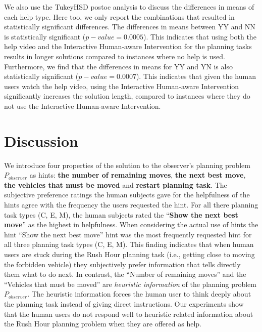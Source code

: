 We also use the TukeyHSD postoc analysis to discuss the differences in means of each help type.
Here too, we only report the combinations that resulted in statistically significant differences.
The differences in means between YY and NN is statistically significant ($p-value=0.0005$).
This indicates that using both the help video and the Interactive Human-aware Intervention  for the planning tasks results in longer solutions compared to instances where no help is used.
Furthermore, we find that the differences in means for YY and YN is also statistically significant ($p-value=0.0007$).
This indicates that given the human users watch the help video, using the Interactive Human-aware Intervention significantly increases the solution length, compared to instances where they do not use the Interactive Human-aware Intervention.


\section{Discussion}
We introduce four properties of the solution to the observer's planning problem $P_{observer}$ as hints: \textbf{the number of remaining moves}, \textbf{the next best move}, \textbf{the vehicles that must be moved} and \textbf{restart planning task}.
The subjective preference ratings the human subjects gave for the helpfulness of the hints agree with the frequency the users requested the hint.
For all there planning task types (C, E, M), the human subjects rated the ``\textbf{Show the next best move}'' as the highest in helpfulness.
When considering the actual use of hints the hint ``Show the next best move'' hint was the most frequently requested hint for all three planning task types (C, E, M).
This finding indicates that when human users are stuck during the Rush Hour planning task (i.e., getting close to moving the forbidden vehicle) they subjectively prefer information that tells directly them what to do next.
In contrast, the ``Number of remaining moves'' and the ``Vehicles that must be moved'' are \textit{heuristic information} of the planning problem $P_{observer}$.
The heuristic information forces the human user to think deeply about the planning task instead of giving direct instructions.
Our experiments show that the human users do not respond well to heuristic related information about the Rush Hour planning problem when they are offered as help.

